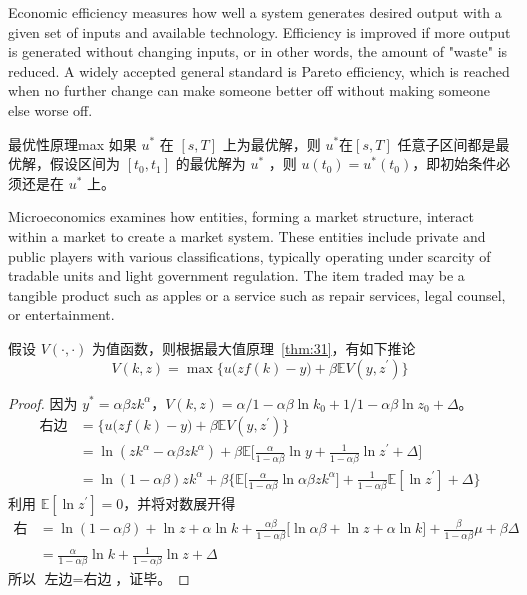 \documentclass[titlestyle=hang,11pt]{elegantbook}
\begin{document}
Economic efficiency measures how well a system generates desired output with a given set of inputs and available technology. Efficiency is improved if more output is generated without changing inputs, or in other words, the amount of "waste" is reduced. A widely accepted general standard is Pareto efficiency, which is reached when no further change can make someone better off without making someone else worse off.

\begin{proposition}{最优性原理}{max}
如果 $u^*$ 在 $[s,T]$ 上为最优解，则 $u^*$在$[s,T]$ 任意子区间都是最优解，假设区间为 $[t_0,t_1]$ 的最优解为 $u^*$ ，则 $u(t_0)=u^{*}(t_0)$，即初始条件必须还是在 $u^*$ 上。
\end{proposition}

Microeconomics examines how entities, forming a market structure, interact within a market to create a market system. These entities include private and public players with various classifications, typically operating under scarcity of tradable units and light government regulation. The item traded may be a tangible product such as apples or a service such as repair services, legal counsel, or entertainment.

\begin{corollary}{}{}
假设 $V(\cdot,\cdot)$ 为值函数，则根据最大值原理~\ref{thm:31}，有如下推论
\[
V(k,z)=\max\Big\{u\big(zf(k)-y\big)+\beta \mathbb{E}V(y,z^\prime)\Big\}
\]
\end{corollary}

\begin{proof}
因为 $y^*=\alpha\beta z k^\alpha$，$V(k,z)=\alpha/1-\alpha\beta\ln k_0+1/1-\alpha\beta \ln z_0+\Delta$。
   \begin{align*}
   \text{右边}&=\Big\{u\big(zf(k)-y\big)+\beta \mathbb{E}V(y,z^\prime)\Big\}\\
   &=\ln(zk^\alpha-\alpha\beta zk^\alpha)+\beta\mathbb{E}\Big[\frac{\alpha}{1-\alpha\beta}\ln y+\frac{1}{1-\alpha\beta}\ln z^\prime+\Delta\Big]\\
   &=\ln(1-\alpha\beta)zk^\alpha+\beta\Big\{\mathbb{E}\big[\frac{\alpha}{1-\alpha\beta}\ln \alpha\beta z k^\alpha\big]+\frac{1}{1-\alpha\beta}\mathbb{E}[\ln z^\prime]+\Delta\Big\}
   \end{align*}
利用 $\mathbb{E}[\ln z^\prime]=0$，并将对数展开得
   \begin{align*}
   \text{右边}&=\ln (1-\alpha\beta)+\ln z+\alpha\ln k+\frac{\alpha\beta}{1-\alpha\beta}\big[\ln \alpha\beta+\ln z+\alpha\ln k\big]+\frac{\beta}{1-\alpha\beta}\mu+\beta \Delta\\
   &=\frac{\alpha}{1-\alpha\beta}\ln k+\frac{1}{1-\alpha\beta}\ln z+\Delta
   \end{align*}
所以 $\text{左边}=\text{右边}$，证毕。
\end{proof}
\end{document}
